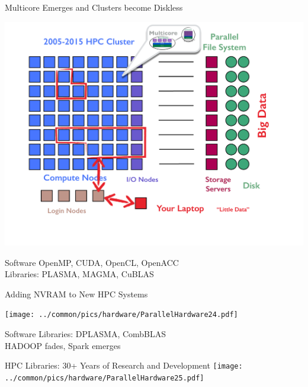 \begin{frame}{Multicore Emerges and Clusters become Diskless}
\begin{minipage}{8.0cm}
  \includegraphics[trim=2cm 0cm 0cm 0cm,clip=true,height=0.8\textheight]
  {../common/pics/hardware/ParallelHardware23.pdf}
\end{minipage}
\begin{minipage}{3.7cm}\small
  \begin{block}{Software}\pause
    \scriptsize OpenMP, CUDA, OpenCL, OpenACC \\[1ex]
    Libraries: PLASMA, MAGMA, CuBLAS
  \end{block}
\end{minipage}
\end{frame}

\begin{frame}{Adding NVRAM to New HPC Systems}
\begin{minipage}{8.0cm}
\texttt{[image: ../common/pics/hardware/ParallelHardware24.pdf]}
\end{minipage}
\begin{minipage}{3.7cm}\small
  \begin{block}{Software}\pause
    \scriptsize
    Libraries: DPLASMA, CombBLAS \\[1ex]
    HADOOP fades, Spark emerges
  \end{block}
\end{minipage}
\end{frame}

\begin{frame}{HPC Libraries: 30+ Years of Research and Development}
\texttt{[image: ../common/pics/hardware/ParallelHardware25.pdf]}
\end{frame}

